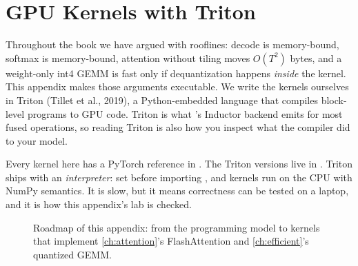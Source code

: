 \chapter{GPU Kernels with Triton}\label{app:triton}

Throughout the book we have argued with rooflines: decode is memory-bound, softmax is
memory-bound, attention without tiling moves $O(T^2)$ bytes, and a weight-only int4 GEMM
is fast only if dequantization happens \emph{inside} the kernel. This appendix makes those
arguments executable. We write the kernels ourselves in Triton (Tillet et al., 2019), a
Python-embedded language that compiles block-level programs to GPU code. Triton is what
's Inductor backend emits for most fused operations, so reading
Triton is also how you inspect what the compiler did to your model.

Every kernel here has a PyTorch reference in . The
Triton versions live in . Triton ships with an
\emph{interpreter}: set  before importing , and
kernels run on the CPU with NumPy semantics. It is slow, but it means correctness can be
tested on a laptop, and it is how this appendix's lab is checked.

\begin{figure}[t]
\centering
{}
\caption{Roadmap of this appendix: from the programming model to kernels that implement
\cref{ch:attention}'s FlashAttention and \cref{ch:efficient}'s quantized GEMM.}
\label{fig:triton:roadmap}
\end{figure}

